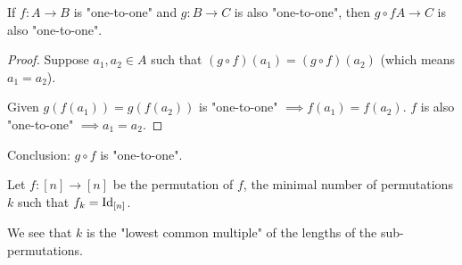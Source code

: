 \documentclass[00_complete]{subfiles}
\begin{document}
\begin{claim}
If $f: A \to B$ is "one-to-one" and $g: B \to C$ is also "one-to-one", then $g
\circ f A \to C$ is also "one-to-one".
\end{claim}

\begin{proof}
Suppose $a_1, a_2 \in A$ such that $(g \circ f)(a_1)=(g \circ f)(a_2)$ (which
means $a_1=a_2$).

Given $g(f(a_1))=g(f(a_2))$ is "one-to-one" $\implies f(a_1)=f(a_2)$. $f$ is
also "one-to-one" $\implies a_1=a_2$.
\end{proof}

\begin{conclusion}
Conclusion: $g \circ f$ is "one-to-one".
\end{conclusion}

\begin{definition}
Let $f: [n] \to [n]$ be the permutation of $f$, the minimal number of
permutations $k$ such that $f_k=\operatorname{Id}_{[n]}$.

We see that $k$ is the "lowest common multiple" of the lengths of the
sub-permutations.
\end{definition}
\end{document}
